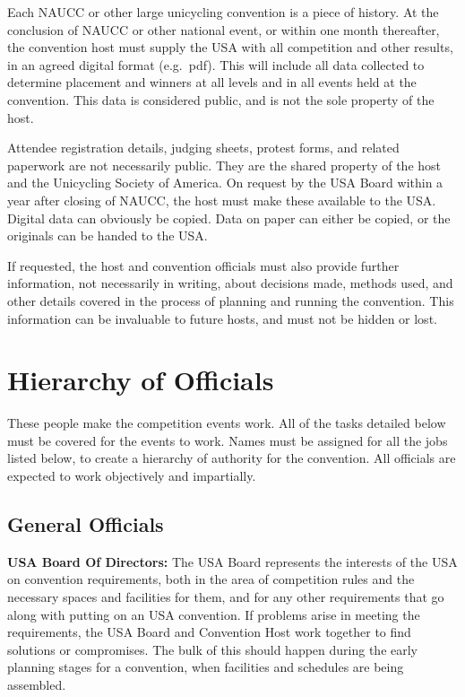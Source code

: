 Each NAUCC or other large unicycling convention is a piece of history.
At the conclusion of NAUCC or other national event, or within one month thereafter, the convention host must supply the USA with all competition and other results, in an agreed digital format (e.g.\ pdf).
This will include all data collected to determine placement and winners at all levels and in all events held at the convention.
This data is considered public, and is not the sole property of the host.

Attendee registration details, judging sheets, protest forms, and related paperwork are not necessarily public.
They are the shared property of the host and the Unicycling Society of America.
On request by the USA Board within a year after closing of NAUCC, the host must make these available to the USA.
Digital data can obviously be copied. Data on paper can either be copied, or the originals can be handed to the USA.

If requested, the host and convention officials must also provide further information, not necessarily in writing, about decisions made, methods used, and other details covered in the process of planning and running the convention.
This information can be invaluable to future hosts, and must not be hidden or lost.

\section{Hierarchy of Officials}

These people make the competition events work.
All of the tasks detailed below must be covered for the events to work.
Names must be assigned for all the jobs listed below, to create a hierarchy of authority for the convention.
All officials are expected to work objectively and impartially.

\subsection{General Officials}

\textbf{USA Board Of Directors:} The USA Board represents the interests of the USA on convention requirements, both in the area of competition rules and the necessary spaces and facilities for them, and for any other requirements that go along with putting on an USA convention.
If problems arise in meeting the requirements, the USA Board and Convention Host work together to find solutions or compromises.
The bulk of this should happen during the early planning stages for a convention, when facilities and schedules are being assembled.

